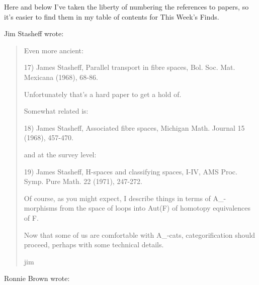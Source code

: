 Here and below I've taken the liberty of numbering the references to
papers, so it's easier to find them in my table of contents for This
Week's Finds.  

Jim Stasheff wrote:

\begin{quote}
 Even more ancient:

 
17) James Stasheff, 
 Parallel transport in fibre spaces, Bol. Soc. Mat. Mexicana (1968), 68-86.

 Unfortunately that's a hard paper to get a hold of.

 Somewhat related is:

18) James Stasheff, 
 Associated fibre spaces, Michigan Math. Journal 15 (1968), 457-470.

 and at the survey level:

19) James Stasheff, 
 H-spaces and classifying spaces, I-IV, AMS Proc. Symp. Pure Math.
 22 (1971), 247-272.

 Of course, as you might expect, I describe things in terms of
 A_{\infty }-morphisms from the space of loops into Aut(F) of homotopy 
 equivalences of F.

 Now that some of us are comfortable with A_{\infty }-cats,
 categorification should proceed, perhaps with some technical details.

 jim
\end{quote}

Ronnie Brown wrote:


